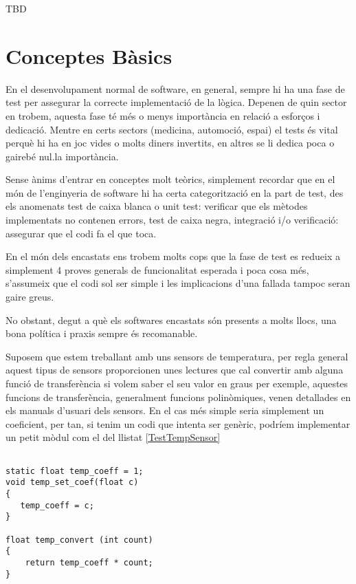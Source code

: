 TBD
\chapter{Conceptes Bàsics}
\label{ch:test_1}

En el desenvolupament normal de software, en general, sempre hi ha una
fase de test per assegurar la correcte implementació de la
lògica. Depenen de quin sector en trobem, aquesta fase té més o menys importància en relació a esforços i dedicació. Mentre en certs sectors (medicina, automoció, espai) el tests és vital perquè hi ha en joc vides o molts diners invertits, en altres se li dedica poca o gairebé nul.la importància.

Sense ànims d'entrar en conceptes molt teòrics, simplement recordar que en el món de l'enginyeria de software hi ha certa categorització en la part de test, des els anomenats test de caixa blanca o unit test: verificar que els mètodes implementats no contenen errors, test de caixa negra, integració i/o  verificació: assegurar que el codi fa el que toca.

En el món dels encastats ens trobem molts cops que la fase de test es redueix a simplement 4 proves generals de funcionalitat esperada i poca cosa més, s'assumeix que el codi sol ser simple i les implicacions d'una fallada tampoc seran gaire greus.

No obstant, degut a què els softwares encastats són presents a molts llocs, una bona política i praxis sempre és recomanable.

Suposem que estem treballant amb uns sensors de temperatura, per regla general aquest tipus de sensors proporcionen unes lectures que cal convertir amb alguna funció de transferència si volem saber el seu valor en graus per exemple, aquestes funcions de transferència, generalment funcions polinòmiques, venen detallades en els manuals d'usuari dels sensors. En el cas més simple seria simplement un coeficient, per tan, si tenim un codi que intenta ser genèric, podríem implementar un petit mòdul com el del llistat \ref{TestTempSensor}

\begin{lstlisting}[caption={Conversió sensor de temperatura},style=customc,label=TestTempSensor]

static float temp_coeff = 1;
void temp_set_coef(float c)
{
   temp_coeff = c;
}

float temp_convert (int count)
{
    return temp_coeff * count;
}
\end{lstlisting}

